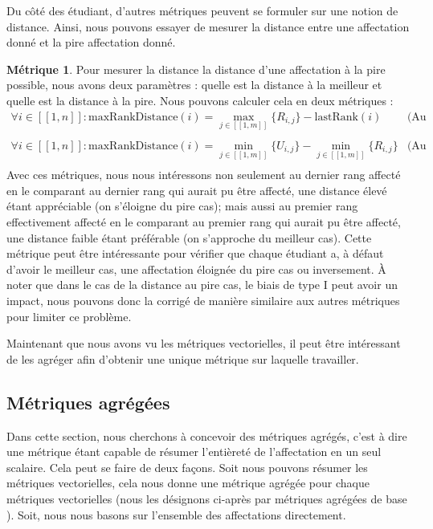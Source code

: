 \documentclass{rapport}
\theoremstyle{definition}
\theoremstyle{remark}
\theoremstyle{definition}
\newtheorem*{metric}{Métrique}
\theoremstyle{remark}
\newcommand{\llbracket}{[\![}
\newcommand{\rrbracket}{]\!]}
\begin{document}
Du côté des étudiant, d'autres métriques peuvent se formuler sur une notion de distance. Ainsi, nous pouvons essayer de mesurer la distance entre une affectation donné et la pire affectation donné.
\begin{metric}
    Pour mesurer la distance la distance d'une affectation à la pire possible, nous avons deux paramètres : quelle est la distance à la meilleur et quelle est la distance à la pire.
    Nous pouvons calculer cela en deux métriques :
    $$
        \begin{matrix}
            \forall i \in \llbracket 1,n \rrbracket : \text{maxRankDistance}(i) = \max_{j\in\llbracket 1,m\rrbracket} \{R_{i,j}\} - \text{lastRank}(i) & \text{(Au pire)}\\
            &\\
            \forall i \in \llbracket 1,n \rrbracket : \text{maxRankDistance}(i) = \min_{j\in\llbracket 1,m\rrbracket} \{U_{i,j}\} - \min_{j\in\llbracket 1,m\rrbracket} \{R_{i,j}\} & \text{(Au meilleur)}\\
        \end{matrix}
    $$
    Avec ces métriques, nous nous intéressons non seulement au dernier rang affecté en le comparant au dernier rang qui aurait pu être affecté, une distance élevé étant appréciable (on s'éloigne du pire cas); mais aussi au premier rang effectivement affecté en le comparant au premier rang qui aurait pu être affecté, une distance faible étant préférable (on s'approche du meilleur cas).
    Cette métrique peut être intéressante pour vérifier que chaque étudiant a, à défaut d'avoir le meilleur cas, une affectation éloignée du pire cas ou inversement.
    À noter que dans le cas de la distance au pire cas, le biais de type I peut avoir un impact, nous pouvons donc la corrigé de manière similaire aux autres métriques pour limiter ce problème.
\end{metric}

Maintenant que nous avons vu les métriques vectorielles, il peut être intéressant de les agréger afin d'obtenir une unique métrique sur laquelle travailler.

\subsection{Métriques agrégées}
Dans cette section, nous cherchons à concevoir des métriques agrégés, c'est à dire une métrique étant capable de résumer l'entièreté de l'affectation en un seul scalaire.
Cela peut se faire de deux façons. Soit nous pouvons résumer les métriques vectorielles, cela nous donne une métrique agrégée pour chaque métriques vectorielles (nous les désignons ci-après par \og métriques agrégées de base \fg).
Soit, nous nous basons sur l'ensemble des affectations directement.
\end{document}
